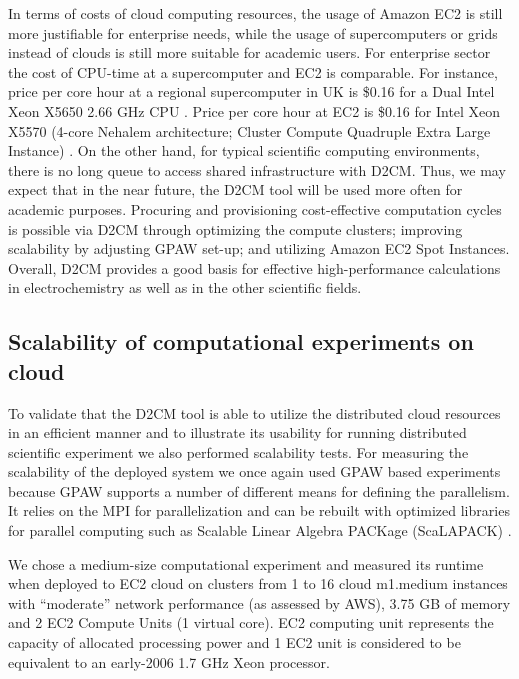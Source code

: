 \documentclass[a4paper,10pt]{article}
\begin{document}
In terms of costs of cloud computing resources, the usage of Amazon EC2 is still more justifiable for enterprise needs, while the usage of supercomputers or grids instead of clouds is still more suitable for academic users. For enterprise sector the cost of CPU-time at a supercomputer and EC2 is comparable. For instance, price per core hour at a regional supercomputer in UK is \$0.16 for a Dual Intel Xeon X5650 2.66 GHz CPU \cite{archie}. Price per core hour at EC2 is \$0.16 for Intel Xeon X5570 (4-core Nehalem architecture; Cluster Compute Quadruple Extra Large Instance) \cite{amazon:price}. On the other hand, for typical scientific computing environments, there is no long queue to access shared infrastructure with D2CM. Thus, we may expect that in the near future, the D2CM tool will be used more often for academic purposes. Procuring and provisioning cost-effective computation cycles is possible via D2CM through optimizing the compute clusters; improving scalability by adjusting GPAW set-up; and utilizing Amazon EC2 Spot Instances. Overall, D2CM provides a good basis for effective high-performance calculations in electrochemistry as well as in the other scientific fields.









\subsection{Scalability of computational experiments on cloud}

To validate that the D2CM tool is able to utilize the distributed cloud resources in an efficient manner and to illustrate its usability for running distributed scientific experiment we also performed scalability tests. For measuring the scalability of the deployed system we once again used GPAW based experiments because GPAW supports a number of different means for defining the parallelism. It relies on the MPI for parallelization and can be rebuilt with optimized libraries for parallel computing such as Scalable Linear Algebra PACKage (ScaLAPACK) \cite{scalapack}.

We chose a medium-size computational experiment and measured its runtime when deployed to EC2 cloud on clusters from 1 to 16 cloud m1.medium instances with ``moderate'' network performance (as assessed by AWS), 3.75 GB of memory and 2 EC2 Compute
Units (1 virtual core). EC2 computing unit represents the capacity of allocated processing power and 1 EC2 unit is considered to be equivalent to an early-2006 1.7 GHz Xeon processor. 
\end{document}
